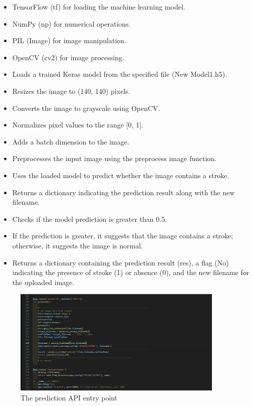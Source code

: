 \begin{itemize}
    \item TensorFlow (tf) for loading the machine learning model.
    \item NumPy (np) for numerical operations.
    \item PIL (Image) for image manipulation.
    \item OpenCV (cv2) for image processing.
    \item Loads a trained Keras model from the specified file (New Model1.h5).
    \item Resizes the image to (140, 140) pixels.
    \item Converts the image to grayscale using OpenCV.
    \item Normalizes pixel values to the range [0, 1].
    \item Adds a batch dimension to the image.
    \item Preprocesses the input image using the preprocess image function.
    \item Uses the loaded model to predict whether the image contains a stroke.
    \item Returns a dictionary indicating the prediction result along with the new filename.
    \item Checks if the model prediction is greater than 0.5.
    \item If the prediction is greater, it suggests that the image contains a stroke; otherwise, it suggests the image is normal.
    \item Returns a dictionary containing the prediction result (res), a flag (No) indicating the presence of stroke (1) or absence (0), and the new filename for the uploaded image.
\end{itemize}

\begin{figure}
    \centering
    \includegraphics[width=0.90\textwidth]{Img/Chap-01/48.jpg}
    \caption{The prediction API entry point}
    \label{fig:be_7}
\end{figure}

